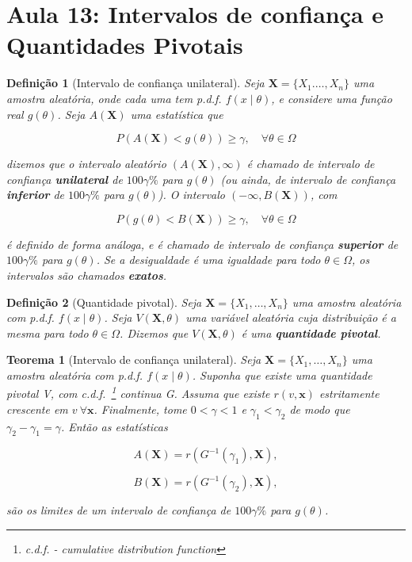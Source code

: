 \documentclass{article}
\newtheorem{theorem}{Teorema}
\newtheorem{definition}{Definição}
\begin{document}
\section*{Aula 13: Intervalos de confiança e Quantidades Pivotais}
\label{s13}
\begin{definition}[Intervalo de confiança unilateral]
Seja $\textbf{X} = \{ X_1. \ldots, X_n \}$ uma amostra aleatória, onde cada uma tem p.d.f. $f(x \mid \theta)$, e considere uma função real $g(\theta)$. Seja $A( \textbf{X})$ uma estatística que

$$P(A(\textbf{X}) < g(\theta)) \geq \gamma, \quad \forall \theta \in \Omega$$

dizemos que o intervalo aleatório $( A(\textbf{X}), \infty)$ é chamado de intervalo de confiança \textbf{unilateral} de $100\gamma \%$ para $g(\theta)$ (ou ainda, de intervalo de confiança \textbf{inferior} de $100\gamma \%$ para $g(\theta)$). O intervalo $(-\infty, B(\textbf{X}))$, com

$$P(g(\theta) < B(\textbf{X})) \geq \gamma, \quad \forall \theta \in \Omega$$

é definido de forma análoga, e é chamado de intervalo de confiança \textbf{superior} de $100\gamma \%$ para $g(\theta)$. Se a desigualdade é uma igualdade para todo $\theta \in \Omega$, os intervalos são chamados \textbf{exatos}.
\end{definition}

\begin{definition}[Quantidade pivotal]
Seja $\textbf{X} = \{ X_1, \ldots, X_n \}$ uma amostra aleatória com p.d.f. $f(x \mid \theta)$. Seja $V(\textbf{X}, \theta)$ uma variável aleatória cuja distribuição é a mesma para todo $\theta \in \Omega$. Dizemos que $V(\textbf{X}, \theta)$ é uma \textbf{quantidade pivotal}.
\end{definition}

\begin{theorem}[Intervalo de confiança unilateral]
Seja $\textbf{X} = \{ X_1, \ldots, X_n \}$ uma amostra aleatória com p.d.f. $f(x \mid \theta)$. Suponha que existe uma quantidade pivotal V, com c.d.f.~\footnote{c.d.f. - cumulative distribution function} continua G. Assuma que existe $r(v, \textbf{x})$ estritamente crescente em $v \ \forall \textbf{x}$. Finalmente, tome $0 < \gamma < 1$ e $\gamma_1 < \gamma_2$ de modo que $\gamma_2 - \gamma_1 = \gamma$. Então as estatísticas

$$A(\textbf{X}) = r(G^{-1}(\gamma_1), \textbf{X}),$$

$$B(\textbf{X}) = r(G^{-1}(\gamma_2), \textbf{X}),$$

são os limites de um intervalo de confiança de $100\gamma \%$ para $g(\theta)$.
\end{theorem}
\end{document}
